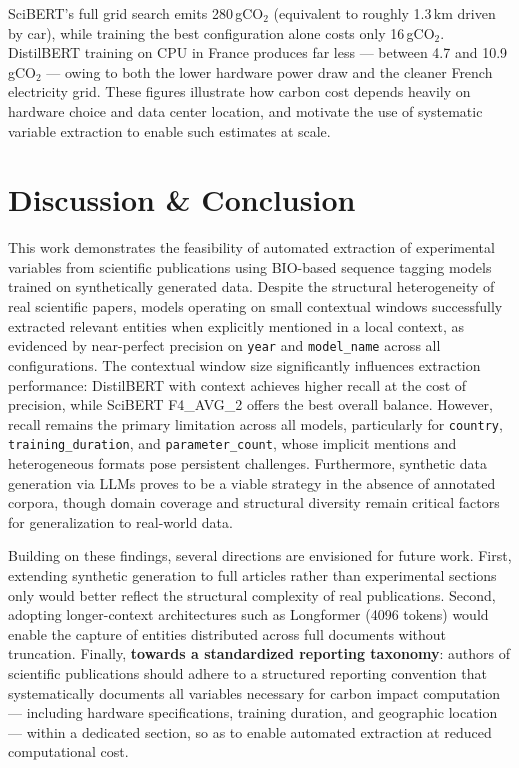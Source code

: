 \documentclass{article}
\theoremstyle{plain}
\theoremstyle{definition}
\theoremstyle{remark}
\begin{document}
SciBERT's full grid search emits 280\,gCO$_2$ (equivalent to roughly 1.3\,km driven by car), while training the best configuration alone costs only 16\,gCO$_2$. DistilBERT training on CPU in France produces far less — between 4.7 and 10.9\,gCO$_2$ — owing to both the lower hardware power draw and the cleaner French electricity grid. These figures illustrate how carbon cost depends heavily on hardware choice and data center location, and motivate the use of systematic variable extraction to enable such estimates at scale.

\section{Discussion \& Conclusion}

This work demonstrates the feasibility of automated extraction of experimental variables from scientific publications using BIO-based sequence tagging models trained on synthetically generated data. Despite the structural heterogeneity of real scientific papers, models operating on small contextual windows successfully extracted relevant entities when explicitly mentioned in a local context, as evidenced by near-perfect precision on \texttt{year} and \texttt{model\_name} across all configurations. The contextual window size significantly influences extraction performance: DistilBERT with context achieves higher recall at the cost of precision, while SciBERT F4\_AVG\_2 offers the best overall balance. However, recall remains the primary limitation across all models, particularly for \texttt{country}, \texttt{training\_duration}, and \texttt{parameter\_count}, whose implicit mentions and heterogeneous formats pose persistent challenges. Furthermore, synthetic data generation via LLMs proves to be a viable strategy in the absence of annotated corpora, though domain coverage and structural diversity remain critical factors for generalization to real-world data.

Building on these findings, several directions are envisioned for future work. First, extending synthetic generation to full articles rather than experimental sections only would better reflect the structural complexity of real publications. Second, adopting longer-context architectures such as Longformer (4096 tokens) would enable the capture of entities distributed across full documents without truncation. Finally, \textbf{towards a standardized reporting taxonomy}: authors of scientific publications should adhere to a structured reporting convention that systematically documents all variables necessary for carbon impact computation — including hardware specifications, training duration, and geographic location — within a dedicated section, so as to enable automated extraction at reduced computational cost.
\end{document}
